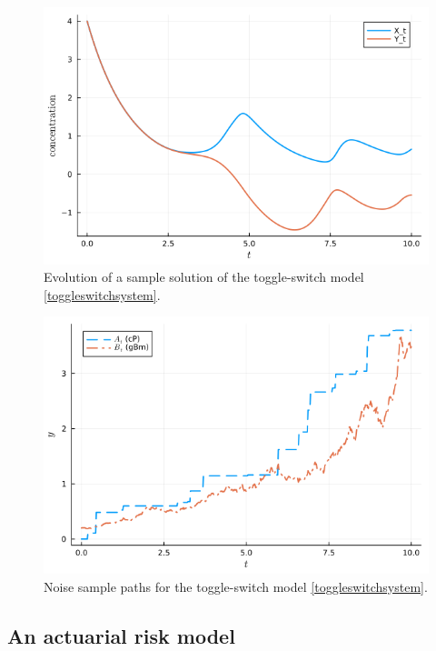 \documentclass[reqno,12pt]{amsart}
\theoremstyle{plain} %
\theoremstyle{definition} %
\begin{document}
\begin{figure}[htb]
    \includegraphics[scale=0.6]{img/evolution_toggleswitch.png}
    \caption{Evolution of a sample solution of the toggle-switch model \eqref{toggleswitchsystem}.}
    \label{figtoggleswitchevolution}
\end{figure}

\begin{figure}[htb]
    \includegraphics[scale=0.6]{img/noises_toggleswitch.png}
    \caption{Noise sample paths for the toggle-switch model \eqref{toggleswitchsystem}.}
    \label{figtoggleswitchnoise}
\end{figure}

\subsection{An actuarial risk model}
\end{document}
